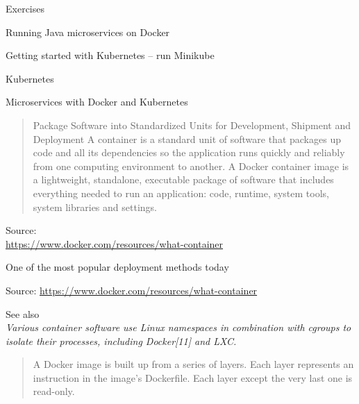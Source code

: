 \documentclass[Screen16to9,17pt]{foils}
\begin{document}
Exercises
\begin{list2}
\item Running Java microservices on Docker
\item Getting started with Kubernetes -- run Minikube
\end{list2}





Kubernetes

Microservices with Docker and Kubernetes




\begin{quote}
  Package Software into Standardized Units for Development, Shipment and Deployment
  A container is a standard unit of software that packages up code and all its dependencies so the application runs quickly and reliably from one computing environment to another. A Docker container image is a lightweight, standalone, executable package of software that includes everything needed to run an application: code, runtime, system tools, system libraries and settings.
\end{quote}
Source: \\{\footnotesize
\url{https://www.docker.com/resources/what-container}}

\begin{list2}
  \item One of the most popular deployment methods today
\end{list2}



Source: {\footnotesize
\url{https://www.docker.com/resources/what-container}}

\begin{list2}
  \item See also \\
   \emph{Various container software use Linux namespaces in combination with cgroups to isolate their processes, including Docker[11] and LXC.}
\end{list2}



\begin{quote}
A Docker image is built up from a series of layers. Each layer represents an instruction in the image’s Dockerfile. Each layer except the very last one is read-only.
\end{quote}
\end{document}
